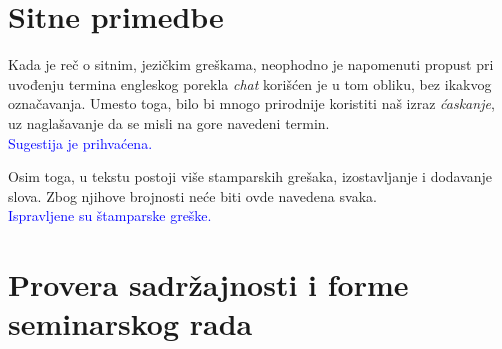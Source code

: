 \documentclass[a4paper]{report}
\newcommand{\odgovor}[1]{\textcolor{blue}{#1}}
\newcommand{\say}[1]{\textit{#1}}
\begin{document}
\section{Sitne primedbe}

Kada je reč o sitnim, jezičkim greškama, neophodno je napomenuti propust pri uvođenju termina engleskog porekla \say{chat} korišćen je u tom obliku, bez ikakvog označavanja. Umesto toga, bilo bi mnogo prirodnije koristiti naš izraz \say{ćaskanje}, uz naglašavanje da se misli na gore navedeni termin.\\
\odgovor{Sugestija je prihvaćena.}

Osim toga, u tekstu postoji više stamparskih grešaka, izostavljanje i dodavanje slova. Zbog njihove brojnosti neće biti ovde navedena svaka.\\
\odgovor{Ispravljene su štamparske greške.}

\section{Provera sadržajnosti i forme seminarskog rada}
\end{document}
